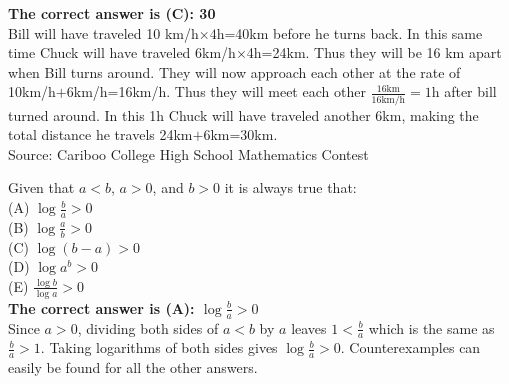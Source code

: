 \documentclass{article}
\begin{document}

\textbf{The correct answer is (C): 30}\\[1 ex]
Bill will have traveled 10 km/h$\times4$h=40km before he turns back. In this same time Chuck will have traveled 6km/h$\times$4h=24km. Thus they will be 16 km apart when Bill turns around. They will now approach each other at the rate of 10km/h$+$6km/h=16km/h. Thus they will meet each other $\frac{16\textrm{km}}{16\textrm{km/h}}=1\textrm{h}$ after bill turned around. In this 1h Chuck will have traveled another 6km, making the total distance he travels 24km$+$6km=30km.
\\[5 ex]

\scriptsize
Source: Cariboo College High School Mathematics Contest

\normalsize
Given that $a<b$, $a>0$, and $b>0$ it is always true that:\\
(A) $\log{\frac{b}{a}}>0$\\[1 ex]
(B) $\log{\frac{a}{b}}>0$\\[1 ex]
(C) $\log{(b-a)}>0$\\[1 ex]
(D) $\log{a^b}>0$\\[1 ex]
(E) $\frac{\log{b}}{\log{a}}>0$\\


\textbf{The correct answer is (A): $\log{\frac{b}{a}}>0$}\\[1 ex]
Since $a>0$, dividing both sides of $a<b$ by $a$ leaves $1<\frac{b}{a}$ which is the same as $\frac{b}{a}>1$. Taking logarithms of both sides gives $\log{\frac{b}{a}}>0$. Counterexamples can easily be found for all the other answers.
\\[5 ex]
\end{document}
